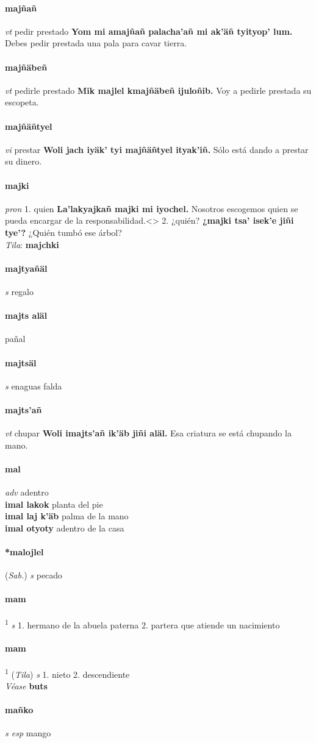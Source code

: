 \documentclass{scrbook}
\newcommand{\entry}[1]{\paragraph{#1}}
\newcommand{\onedefinition}[1]{#1.}
\newcommand{\defsuperscript}[1]{\textsuperscript{1}}
\newcommand{\partofspeech}[1]{\textit{#1}}
\newcommand{\spanishtranslation}[1]{#1}
\newcommand{\cholexample}[1]{\textbf{#1}}
\newcommand{\exampletranslation}[1]{#1}
\newcommand{\dialectvariant}[1]{\\\textit{#1}:}
\newcommand{\dialectword}[1]{\textbf{#1}}
\newcommand{\alsosee}[1]{\\\textit{Véase} \textbf{#1}}
\newcommand{\relevantdialect}[1]{(\textit{#1})}
\newcommand{\secondaryentry}[1]{\\\textbf{#1}}
\newcommand{\secondtranslation}[1]{#1}
\begin{document}
\begin{multicols}{2}
\entry{majñañ}
\partofspeech{vt}
\spanishtranslation{pedir prestado}
\cholexample{Yom mi amajñañ palacha'añ mi ak'äñ tyityop' lum.}
\exampletranslation{Debes pedir prestada una pala para cavar tierra.}

\entry{majñäbeñ}
\partofspeech{vt}
\spanishtranslation{pedirle prestado}
\cholexample{Mik majlel kmajñäbeñ ijuloñib.}
\exampletranslation{Voy a pedirle prestada su escopeta.}

\entry{majñäñtyel}
\partofspeech{vi}
\spanishtranslation{prestar}
\cholexample{Woli jach iyäk' tyi majñäñtyel ityak'iñ.}
\exampletranslation{Sólo está dando a prestar su dinero.}

\entry{majki}
\partofspeech{pron}
\onedefinition{1}
\spanishtranslation{quien}
\cholexample{La'lakyajkañ majki mi iyochel.}
\exampletranslation{Nosotros escogemos quien se pueda encargar de la responsabilidad.<>}
\onedefinition{2}
\spanishtranslation{¿quién?}
\cholexample{¿majki tsa' isek'e jiñi tye'?}
\exampletranslation{¿Quién tumbó ese árbol?}
\dialectvariant{Tila}
\dialectword{majchki}

\entry{majtyañäl}
\partofspeech{s}
\spanishtranslation{regalo}

\entry{majts aläl}
\spanishtranslation{pañal}

\entry{majtsäl}
\partofspeech{s}
\spanishtranslation{enaguas}
\spanishtranslation{falda}

\entry{majts'añ}
\partofspeech{vt}
\spanishtranslation{chupar}
\cholexample{Woli imajts'añ ik'äb jiñi aläl.}
\exampletranslation{Esa criatura se está chupando la mano.}

\entry{mal}
\partofspeech{adv}
\spanishtranslation{adentro}
\secondaryentry{imal lakok}
\secondtranslation{planta del pie}
\secondaryentry{imal laj k'äb}
\secondtranslation{palma de la mano}
\secondaryentry{imal otyoty}
\secondtranslation{adentro de la casa}

\entry{*malojlel}
\relevantdialect{Sab.}
\partofspeech{s}
\spanishtranslation{pecado}

\entry{mam}
\defsuperscript{1}
\partofspeech{s}
\onedefinition{1}
\spanishtranslation{hermano de la abuela paterna}
\onedefinition{2}
\spanishtranslation{partera que atiende un nacimiento}

\entry{mam}
\defsuperscript{2}
\relevantdialect{Tila}
\partofspeech{s}
\onedefinition{1}
\spanishtranslation{nieto}
\onedefinition{2}
\spanishtranslation{descendiente}
\alsosee{buts}

\entry{mañko}
\partofspeech{s esp}
\spanishtranslation{mango}


\end{multicols}
\end{document}
